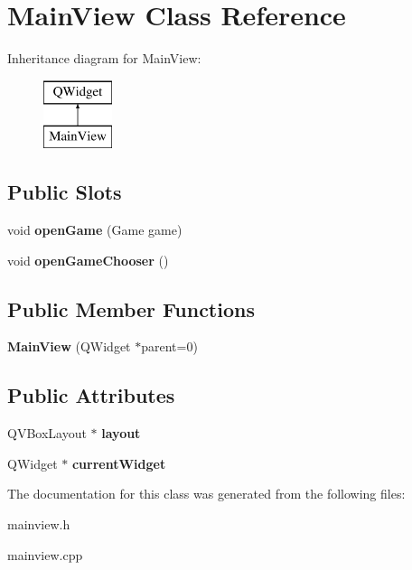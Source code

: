 \hypertarget{classMainView}{\section{Main\-View Class Reference}
\label{classMainView}
}
Inheritance diagram for Main\-View\-:\begin{figure}[H]
\begin{center}
\leavevmode
\includegraphics[height=2.000000cm]{classMainView}
\end{center}
\end{figure}
\subsection*{Public Slots}
\begin{DoxyCompactItemize}
\item 
\hypertarget{classMainView_a66c761b3273453b92030ce73478a4cd5}{void {\bfseries open\-Game} (Game game)}\label{classMainView_a66c761b3273453b92030ce73478a4cd5}

\item 
\hypertarget{classMainView_a3c08a1a03cb97e803d65403b3e2cfb5d}{void {\bfseries open\-Game\-Chooser} ()}\label{classMainView_a3c08a1a03cb97e803d65403b3e2cfb5d}

\end{DoxyCompactItemize}
\subsection*{Public Member Functions}
\begin{DoxyCompactItemize}
\item 
\hypertarget{classMainView_aa7a1124577132170a15a381439beedc8}{{\bfseries Main\-View} (Q\-Widget $\ast$parent=0)}\label{classMainView_aa7a1124577132170a15a381439beedc8}

\end{DoxyCompactItemize}
\subsection*{Public Attributes}
\begin{DoxyCompactItemize}
\item 
\hypertarget{classMainView_a62bfdd7102795176163f71124ff3eca8}{Q\-V\-Box\-Layout $\ast$ {\bfseries layout}}\label{classMainView_a62bfdd7102795176163f71124ff3eca8}

\item 
\hypertarget{classMainView_ae95fe5bf54b664146fa1698e4edcef4b}{Q\-Widget $\ast$ {\bfseries current\-Widget}}\label{classMainView_ae95fe5bf54b664146fa1698e4edcef4b}

\end{DoxyCompactItemize}


The documentation for this class was generated from the following files\-:\begin{DoxyCompactItemize}
\item 
mainview.\-h\item 
mainview.\-cpp\end{DoxyCompactItemize}
